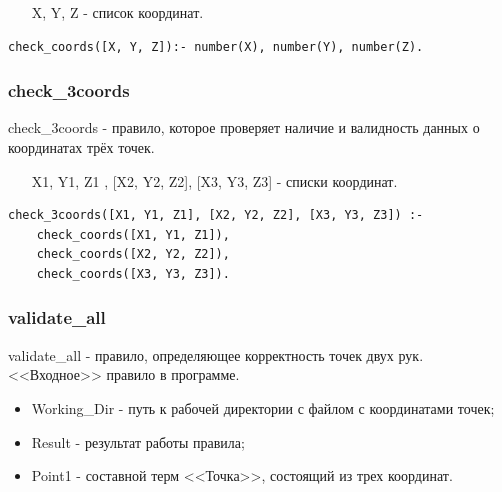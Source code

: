 \begin{itemize}
	\item [X, Y, Z] - список координат.
\end{itemize}

\begin{lstlisting}[caption=Реализация правила check\_coords, label=rules:checkcoords]
check_coords([X, Y, Z]):- number(X), number(Y), number(Z).
\end{lstlisting}

\subsubsection{check\_3coords}
\hspace{0.6cm} check\_3coords - правило, которое проверяет наличие и валидность данных о координатах трёх точек.

\begin{itemize}
	\item [X1, Y1, Z1], [X2, Y2, Z2], [X3, Y3, Z3] - списки координат.
\end{itemize}

\begin{lstlisting}[caption=Реализация правила check\_3coords, label=rules:check3coords]
check_3coords([X1, Y1, Z1], [X2, Y2, Z2], [X3, Y3, Z3]) :-
	check_coords([X1, Y1, Z1]),
	check_coords([X2, Y2, Z2]),
	check_coords([X3, Y3, Z3]).
\end{lstlisting}

\subsubsection{validate\_all}
\hspace{0.6cm} validate\_all - правило, определяющее корректность точек двух рук. <<Входное>> правило в программе.

\begin{itemize}
	\item Working\_Dir - путь к рабочей директории с файлом с координатами точек;
	\item Result - результат работы правила;
	\item Point1 - составной терм <<Точка>>, состоящий из трех координат.
\end{itemize}

